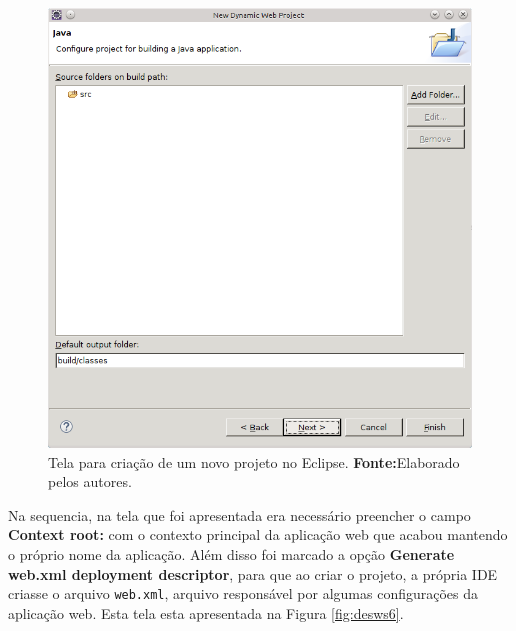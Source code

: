 	\begin{figure}[h!]
		\centerline{\includegraphics[scale=0.8]{./imagens/2_q_metodologico/4_procedimentos_resultados/43_webservice/432_desenvolvimento/desws5.png}}
		\caption[Tela para criação de um novo projeto no Eclipse]{Tela para criação de um novo projeto no Eclipse.
			\textbf{Fonte:}Elaborado pelos autores.}
		\label{fig:desws5}
	\end{figure}
	
	\pagebreak
	
	\par Na sequencia, na tela que foi apresentada era necessário preencher o
campo \textbf{Context root:} com o contexto principal da aplicação web que
acabou mantendo o próprio nome da aplicação. Além disso foi marcado a opção
\textbf{Generate web.xml deployment descriptor}, para que ao criar o projeto, a
própria IDE criasse o arquivo \texttt{web.xml}, arquivo responsável por algumas
configurações da aplicação web. Esta tela esta apresentada na Figura
\ref{fig:desws6}.

